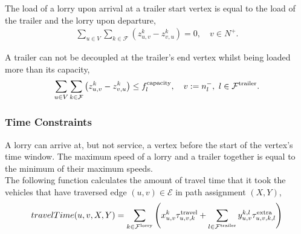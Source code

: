 The load of a lorry upon arrival at a trailer start vertex is equal to the load of the trailer and the lorry upon departure,
\begin{align}
  \sum_{u \in V} \sum_{k \in \mathcal F}
  \left( z^k_{u,v} - z^k_{v,u} \right) = 0, \quad
  v \in N^+.
\end{align}






A trailer can not be decoupled at the trailer's end vertex whilst being loaded more than its capacity,
\begin{align}
  \sum_{u \in V}
  \sum_{k \in \mathcal F}
  \left(
  z^k_{u,v} - z^k_{v,u}
  \right) \leq f_l^{\rm capacity} , \quad
  v :=  n^-_l,
   \ l \in \mathcal F^{\rm trailer}.
\end{align}






\subsubsection{Time Constraints}



%

A lorry can arrive at, but not service, a vertex before the start of the vertex's time window.
The maximum speed of a lorry and a trailer together is equal to the minimum of their maximum speeds.
\\

The following function calculates the amount of travel time
 that it took the vehicles that have traversed edge $(u,v) \in \mathcal E$ in path assignment $(X,Y)$,
%
\begin{align}
  travelTime(u,v,X,Y) =
  \sum_{k \in \mathcal F^{\rm lorry}}
  \left (
  x^k_{u,v}
   \tau_{u,v,k}^{\rm travel}
  +
  \sum_{l \in \mathcal F^{\rm trailer}}
  y^{k,l}_{u,v}
  \tau^{\rm extra }_{u,v,k,l}
  \right)
  \notag
  \end{align}

